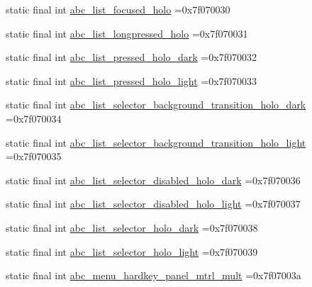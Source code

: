 \begin{DoxyCompactItemize}
\item 
static final int \mbox{\hyperlink{classbr_1_1unb_1_1cic_1_1mp_1_1marketmaster_1_1R_1_1drawable_acc9829f652689c94a199f6efd03ea11d}{abc\+\_\+list\+\_\+focused\+\_\+holo}} =0x7f070030
\item 
static final int \mbox{\hyperlink{classbr_1_1unb_1_1cic_1_1mp_1_1marketmaster_1_1R_1_1drawable_a2f0936fdc9a335818d33a7637e5fc931}{abc\+\_\+list\+\_\+longpressed\+\_\+holo}} =0x7f070031
\item 
static final int \mbox{\hyperlink{classbr_1_1unb_1_1cic_1_1mp_1_1marketmaster_1_1R_1_1drawable_aae81c35492c7b39c0d39c7f65f72d674}{abc\+\_\+list\+\_\+pressed\+\_\+holo\+\_\+dark}} =0x7f070032
\item 
static final int \mbox{\hyperlink{classbr_1_1unb_1_1cic_1_1mp_1_1marketmaster_1_1R_1_1drawable_ab4171d301dc5524fbbf37afd0cc911e0}{abc\+\_\+list\+\_\+pressed\+\_\+holo\+\_\+light}} =0x7f070033
\item 
static final int \mbox{\hyperlink{classbr_1_1unb_1_1cic_1_1mp_1_1marketmaster_1_1R_1_1drawable_ad0d980964fbdde83ae202b80f8455b46}{abc\+\_\+list\+\_\+selector\+\_\+background\+\_\+transition\+\_\+holo\+\_\+dark}} =0x7f070034
\item 
static final int \mbox{\hyperlink{classbr_1_1unb_1_1cic_1_1mp_1_1marketmaster_1_1R_1_1drawable_a2b8787d14f30967e6cc45278dc0c3505}{abc\+\_\+list\+\_\+selector\+\_\+background\+\_\+transition\+\_\+holo\+\_\+light}} =0x7f070035
\item 
static final int \mbox{\hyperlink{classbr_1_1unb_1_1cic_1_1mp_1_1marketmaster_1_1R_1_1drawable_a33d70b57dcd9758ef4445ddc6ce11d75}{abc\+\_\+list\+\_\+selector\+\_\+disabled\+\_\+holo\+\_\+dark}} =0x7f070036
\item 
static final int \mbox{\hyperlink{classbr_1_1unb_1_1cic_1_1mp_1_1marketmaster_1_1R_1_1drawable_ab3e403c1c4f5c84d7063f2a8c64349f9}{abc\+\_\+list\+\_\+selector\+\_\+disabled\+\_\+holo\+\_\+light}} =0x7f070037
\item 
static final int \mbox{\hyperlink{classbr_1_1unb_1_1cic_1_1mp_1_1marketmaster_1_1R_1_1drawable_aa300b44f9ef23533ad26469c05015616}{abc\+\_\+list\+\_\+selector\+\_\+holo\+\_\+dark}} =0x7f070038
\item 
static final int \mbox{\hyperlink{classbr_1_1unb_1_1cic_1_1mp_1_1marketmaster_1_1R_1_1drawable_a4b092621cfa9135190e1759b9b3897ba}{abc\+\_\+list\+\_\+selector\+\_\+holo\+\_\+light}} =0x7f070039
\item 
static final int \mbox{\hyperlink{classbr_1_1unb_1_1cic_1_1mp_1_1marketmaster_1_1R_1_1drawable_a470228f6a4cdf712090170b4db49a290}{abc\+\_\+menu\+\_\+hardkey\+\_\+panel\+\_\+mtrl\+\_\+mult}} =0x7f07003a

\end{DoxyCompactItemize}
